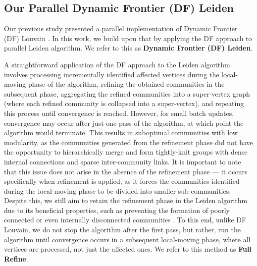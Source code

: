 \subsection{Our Parallel Dynamic Frontier (DF) Leiden}

Our previous study presented a parallel implementation of Dynamic Frontier (DF) Louvain \cite{sahu2024dflouvain}. In this work, we build upon that by applying the DF approach to parallel Leiden algorithm. We refer to this as \textbf{Dynamic Frontier (DF) Leiden}.

A straightforward application of the DF approach to the Leiden algorithm involves processing incrementally identified affected vertices during the local-moving phase of the algorithm, refining the obtained communities in the subsequent phase, aggregating the refined communities into a super-vertex graph (where each refined community is collapsed into a super-vertex), and repeating this process until convergence is reached. However, for small batch updates, convergence may occur after just one pass of the algorithm, at which point the algorithm would terminate. This results in suboptimal communities with low modularity, as the communities generated from the refinement phase did not have the opportunity to hierarchically merge and form tightly-knit groups with dense internal connections and sparse inter-community links. It is important to note that this issue does not arise in the absence of the refinement phase --- it occurs specifically when refinement is applied, as it forces the communities identified during the local-moving phase to be divided into smaller sub-communities. Despite this, we still aim to retain the refinement phase in the Leiden algorithm due to its beneficial properties, such as preventing the formation of poorly connected or even internally disconnected communities \cite{com-traag19}. To this end, unlike DF Louvain, we do not stop the algorithm after the first pass, but rather, run the algorithm until convergence occurs in a subsequent local-moving phase, where all vertices are processed, not just the affected ones. We refer to this method as \textbf{Full Refine}.


